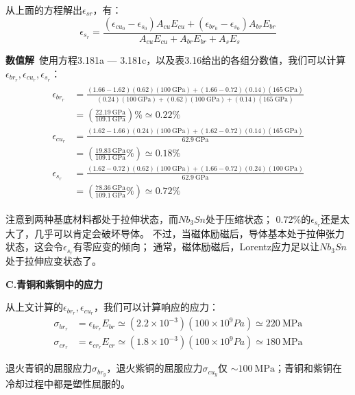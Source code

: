 从上面的方程解出$\epsilon_{sr}$，有：
\begin{equation*}%
\epsilon_{s_r}=\frac{(\epsilon_{cu_0}-\epsilon_{s_0})A_{cu}E_{cu}+(\epsilon_{br_0}-\epsilon_{s_0})A_{br}E_{br}}{A_{cu}E_{cu}+A_{br}E_{br}+A_{s}E_{s}}\tag{3.181c}
\end{equation*}

\textbf{数值解}\ 使用方程3.181a — 3.181c，以及表3.16给出的各组分数值，我们可以计算
$\epsilon_{br_r},\epsilon_{cu_r}, \epsilon_{s_r}$：
\begin{eqnarray*}%
\begin{split}
\epsilon_{br_r}&=\frac{(1.66-1.62)(0.62)(100\ \mathrm{GPa})+(1.66-0.72)(0.14)(165\ \mathrm{GPa})}{(0.24)(100\ \mathrm{GPa})+(0.62)(100\ \mathrm{GPa})+(0.14)(165\ \mathrm{GPa})}\\
&=(\frac{22.19\ \mathrm{GPa}}{109.1\ \mathrm{GPa}})\% \simeq0.22\% \\
\epsilon_{cu_r}&=\frac{(1.62-1.66)(0.24)(100\ \mathrm{GPa})+(1.62-0.72)(0.14)(165\ \mathrm{GPa})}{62.9\ \mathrm{GPa}}\\
&=(\frac{19.83\ \mathrm{GPa}}{109.1\ \mathrm{GPa}}\%)\simeq0.18\% \\
\epsilon_{s_r}&=\frac{(1.62-0.72)(0.62)(100\ \mathrm{GPa})+(1.66-0.72)(0.24)(100\ \mathrm{GPa})}{62.9\ \mathrm{GPa}}\\
&=(\frac{78.36\ \mathrm{GPa}}{109.1\ \mathrm{GPa}}\%)\simeq0.72\% 
\end{split}
\end{eqnarray*}

注意到两种基底材料都处于拉伸状态，而$Nb_3Sn$处于压缩状态；
0.72\%的$\epsilon_{s_r}$还是太大了，几乎可以肯定会破坏导体。
不过，当磁体励磁后，导体基本处于拉伸张力状态，这会令$\epsilon_{s_r}$有零应变的倾向；
通常，磁体励磁后，Lorentz应力足以让$Nb_3Sn$处于拉伸应变状态了。

\textbf{C.青铜和紫铜中的应力}

从上文计算的$\epsilon_{br_r},\epsilon_{cu_r}$，我们可以计算响应的应力：
 \begin{eqnarray*}
\sigma_{br_r}&=\epsilon_{br_r}E_{br}\simeq(2.2\times10^{-3})(100\times10^9Pa)\simeq220\ \mathrm{MPa}\\
\sigma_{cr_r}&=\epsilon_{cr_r}E_{cr}\simeq(1.8\times10^{-3})(100\times10^9Pa)\simeq180\ \mathrm{MPa}
\end{eqnarray*}

退火青铜的屈服应力$\sigma_{br_y}$，退火紫铜的屈服应力$\sigma_{cu_y}$仅
$\sim 100\ \mathrm{MPa}$；青铜和紫铜在冷却过程中都是塑性屈服的。


